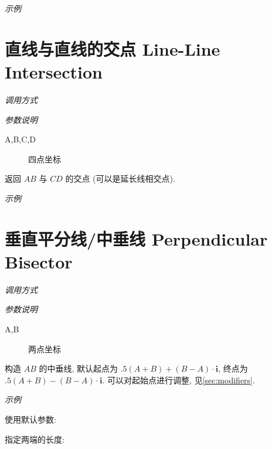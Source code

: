 \emph{示例}



\section{直线与直线的交点 Line-Line Intersection}

\emph{调用方式}

\begin{tcolorbox}{}
\end{tcolorbox}

\emph{参数说明}

\begin{description}
  \item[A,B,C,D] 四点坐标 
\end{description}

返回 $AB$ 与 $CD$ 的交点 (可以是延长线相交点).

\emph{示例}


\section{垂直平分线/中垂线 Perpendicular Bisector}

\emph{调用方式}

\begin{tcolorbox}{}
\end{tcolorbox}

\emph{参数说明}

\begin{description}
  \item[A,B] 两点坐标 
\end{description}

构造 $AB$ 的中垂线, 默认起点为 $.5(A+B)+(B-A) \cdot \mathbf{i}$, 终点为 $.5(A+B)-(B-A) \cdot \mathbf{i}$.
可以对起始点进行调整, 见\ref{sec:modifiers}.

\emph{示例}

使用默认参数:


指定两端的长度:


